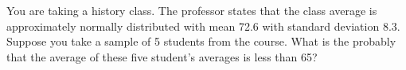 \documentclass[12pt,letterpaper]{exam}
\begin{document}
\begin{questions}
\newpage
\question[10] You are taking a history class. The professor states that the class average is approximately normally distributed with mean 72.6 with standard deviation 8.3. Suppose you take a sample of 5 students from the course. What is the probably that the average of these five student's averages is less than 65?


\end{questions}
\end{document}
